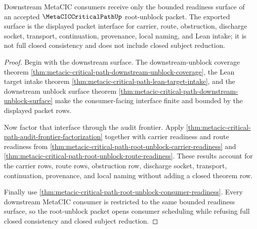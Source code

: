 \begin{theorem}
\label{thm:metacic-critical-path-downstream-readiness-boundary}
Downstream MetaCIC consumers receive only the bounded readiness surface of an accepted $\MetaCICCriticalPathUp$ root-unblock packet. The exported surface is the displayed packet interface for carrier, route, obstruction, discharge socket, transport, continuation, provenance, local naming, and Lean intake; it is not full closed consistency and does not include closed subject reduction.
\end{theorem}
\begin{proof}
Begin with the downstream surface. The downstream-unblock coverage theorem \autoref{thm:metacic-critical-path-downstream-unblock-coverage}, the Lean target intake theorem \autoref{thm:metacic-critical-path-lean-target-intake}, and the downstream unblock surface theorem \autoref{thm:metacic-critical-path-downstream-unblock-surface} make the consumer-facing interface finite and bounded by the displayed packet rows.

Now factor that interface through the audit frontier. Apply \autoref{thm:metacic-critical-path-audit-frontier-factorization} together with carrier readiness and route readiness from \autoref{thm:metacic-critical-path-root-unblock-carrier-readiness} and \autoref{thm:metacic-critical-path-root-unblock-route-readiness}. These results account for the carrier rows, route rows, obstruction row, discharge socket, transport, continuation, provenance, and local naming without adding a closed theorem row.

Finally use \autoref{thm:metacic-critical-path-root-unblock-consumer-readiness}. Every downstream MetaCIC consumer is restricted to the same bounded readiness surface, so the root-unblock packet opens consumer scheduling while refusing full closed consistency and closed subject reduction.
\end{proof}

